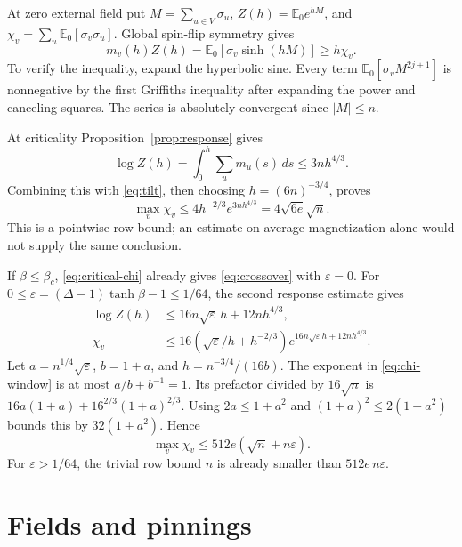 \documentclass[11pt]{article}
\theoremstyle{remark}
\newcommand{\E}{\mathbb E}
\begin{document}
At zero external field put
$M=\sum_{u\in V}\sigma_u$, $Z(h)=\E_0e^{hM}$, and
$\chi_v=\sum_u\E_0[\sigma_v\sigma_u]$.
Global spin-flip symmetry gives
\begin{equation}\label{eq:tilt}
 m_v(h)Z(h)=\E_0[\sigma_v\sinh(hM)]\ge h\chi_v.
\end{equation}
To verify the inequality, expand the hyperbolic sine.
Every term $\E_0[\sigma_vM^{2j+1}]$ is nonnegative by the first
Griffiths inequality after expanding the power and canceling squares.
The series is absolutely convergent since $|M|\le n$.

At criticality Proposition~\ref{prop:response} gives
\[
 \log Z(h)=\int_0^h\sum_um_u(s)\,ds\le3nh^{4/3}.
\]
Combining this with \eqref{eq:tilt}, then choosing
$h=(6n)^{-3/4}$, proves
\begin{equation}\label{eq:critical-chi}
 \max_v\chi_v\le4h^{-2/3}e^{3nh^{4/3}}
                 =4\sqrt{6e}\sqrt n.
\end{equation}
This is a pointwise row bound; an estimate on average magnetization
alone would not supply the same conclusion.

If $\beta\le\beta_c$, \eqref{eq:critical-chi} already gives
\eqref{eq:crossover} with $\varepsilon=0$.
For $0\le\varepsilon=(\Delta-1)\tanh\beta-1\le1/64$,
the second response estimate gives
\begin{align}
 \log Z(h)&\le16n\sqrt\varepsilon\,h+12nh^{4/3},\label{eq:mgf}\\
 \chi_v&\le16(\sqrt\varepsilon/h+h^{-2/3})
                   e^{16n\sqrt\varepsilon h+12nh^{4/3}}.\label{eq:chi-window}
\end{align}
Let $a=n^{1/4}\sqrt\varepsilon$, $b=1+a$, and
$h=n^{-3/4}/(16b)$. The exponent in \eqref{eq:chi-window}
is at most $a/b+b^{-1}=1$.
Its prefactor divided by $16\sqrt n$ is
$16a(1+a)+16^{2/3}(1+a)^{2/3}$.
Using $2a\le1+a^2$ and $(1+a)^2\le2(1+a^2)$ bounds this
by $32(1+a^2)$. Hence
\begin{equation}\label{eq:window-chi}
 \max_v\chi_v\le512e(\sqrt n+n\varepsilon).
\end{equation}
For $\varepsilon>1/64$, the trivial row bound $n$
is already smaller than $512e\,n\varepsilon$.

\section{Fields and pinnings}
\end{document}
